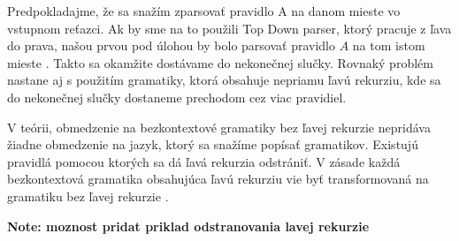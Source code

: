 Predpokladajme, že sa snažím zparsovať pravidlo A na danom mieste vo vstupnom reťazci. Ak by sme na to použili Top Down parser, ktorý pracuje z ľava do prava, našou prvou pod úlohou by bolo parsovať pravidlo $A$ na tom istom mieste \cite{moore2000removing}. Takto sa okamžite dostávame do nekonečnej slučky. Rovnaký problém nastane aj s použitím gramatiky, ktorá obsahuje nepriamu ľavú rekurziu, kde sa do nekonečnej slučky dostaneme prechodom cez viac pravidiel.

V teórii, obmedzenie na bezkontextové gramatiky bez ľavej rekurzie nepridáva žiadne obmedzenie na jazyk, ktorý sa snažíme popísať gramatikov. Existujú pravidlá pomocou ktorých sa dá ľavá rekurzia odstrániť. V zásade každá bezkontextová gramatika obsahujúca ľavú rekurziu vie byť transformovaná na gramatiku bez ľavej rekurzie \cite{moore2000removing}.

\textbf{Note: moznost pridat priklad odstranovania lavej rekurzie}
